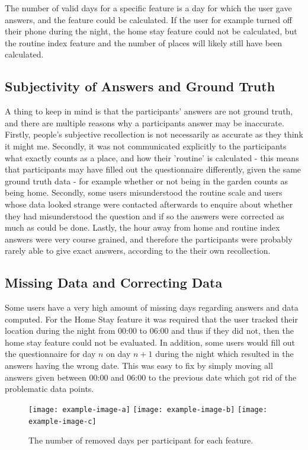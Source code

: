 The number of valid days for a specific feature is a day for which the user gave answers, and the feature could be calculated. If the user for example turned off their phone during the night, the home stay feature could not be calculated, but the routine index feature and the number of places will likely still have been calculated.


\subsection{Subjectivity of Answers and Ground Truth}
A thing to keep in mind is that the participants' answers are not ground truth, and there are multiple reasons why a participants answer may be inaccurate. Firstly, people's subjective recollection is not necessarily as accurate as they think it might me. Secondly, it was not communicated explicitly to the participants what exactly counts as a place, and how their 'routine' is calculated - this means that participants may have filled out the questionnaire differently, given the same ground truth data - for example whether or not being in the garden counts as being home. Secondly, some users misunderstood the routine scale and users whose data looked strange were contacted afterwards to enquire about whether they had misunderstood the question and if so the answers were corrected as much as could be done. Lastly, the hour away from home and routine index answers were very course grained, and therefore the participants were probably rarely able to give exact answers, according to the their own recollection. 

\subsection{Missing Data and Correcting Data}
Some users have a very high amount of missing days regarding answers and data computed. For the Home Stay feature it was required that the user tracked their location during the night from 00:00 to 06:00 and thus if they did not, then the home stay feature could not be evaluated. In addition, some users would fill out the questionnaire for day $n$ on day $n+1$ during the night which resulted in the answers having the wrong date. This was easy to fix by simply moving all answers given between 00:00 and 06:00 to the previous date which got rid of the problematic data points.

\begin{figure}
    \centering
    \texttt{[image: example-image-a]}
    \texttt{[image: example-image-b]}
    \texttt{[image: example-image-c]}
    \caption{The number of removed days per participant for each feature.}
    \label{fig:plot-megabytes}
\end{figure}


